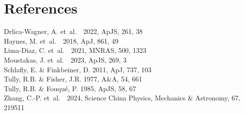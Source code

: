 \documentclass{article}
\newcommand{\etal}{\mbox{\rm{et al.}~~}}
\begin{document}
\section*{References}

Drlica-Wagner, A. \etal 2022, %
ApJS, 261, 38\\
Haynes, M. \etal 2018, %
ApJ, 861, 49\\
Lima-Diaz, C. \etal 2021, MNRAS, 500, 1323\\
Moustakas, J. \etal 2023, ApJS, 269, 3\\
Schlafly, E. \& Finkbeiner, D. 2011, ApJ, 737, 103\\
Tully, R.B. \& Fisher, J.R. 1977, A\&A, 54, 661\\
Tully, R.B. \& Fouqu\'e, P. 1985, %
ApJS, 58, 67\\
Zhang, C.-P. \etal 2024, Science China Physics, Mechanics \& Astronomy, 67, 219511
\clearpage
\end{document}
